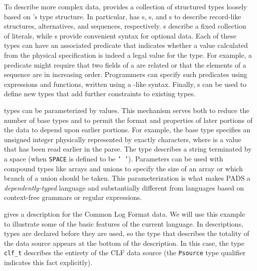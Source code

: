 \documentclass[11pt]{article}
\begin{document}
To describe more complex data, \pads{} provides a collection of
structured types loosely based on \C{}'s type structure.  In
particular, \pads{} has s, s, and s
to describe record-like structures, alternatives, and sequences,
respectively.  s describe a fixed collection of literals,
while s provide convenient syntax for optional data.  Each of
these types can have an associated predicate that indicates whether a
value calculated from the physical specification is indeed a legal
value for the type.  For example, a predicate might require that two
fields of a  are related or that the elements of a
sequence are in increasing order.  Programmers can specify such
predicates using \pads{} expressions and functions, written using a
\C{}-like syntax.  Finally, \pads{} s can be used to
define new types that add further constraints to existing types.

\pads{} types can be parameterized by values.  This mechanism serves
both to reduce the number of base types and to permit the format and
properties of later portions of the data to depend upon earlier
portions.  For example, the base type  specifies
an unsigned integer physically represented by exactly 
characters, where  is a value that has been read earlier in the
parse.  The type  describes a string
terminated by a space (when \texttt{SPACE} is defined to be \texttt{' '}).  
Parameters can be used with compound types like arrays and unions to
specify the size of an array or which branch of a union should be
taken.  This parameterization is what makes PADS a {\em dependently-typed}
language and substantially different from languages based on
context-free grammars or regular expressions.

 gives a \pads{} description for the Common Log Format
data.  
We will use this example to illustrate some of the basic
features of the current \pads{} language.  
In \pads{} descriptions, types are declared before they are used, 
so the type that describes the totality of the data source appears 
at the bottom of the description.  
In this case,
the type \texttt{clf\_t}  describes the entirety of the
CLF data source (the \texttt{Psource} type qualifier indicates
this fact explicitly).  
\end{document}
